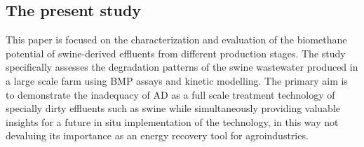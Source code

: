 \subsection{The present study}
This paper is focused on the characterization and evaluation of the biomethane potential of swine-derived effluents from different production stages. The study specifically assesses the degradation patterns of the swine wastewater produced in a large scale farm using BMP assays and kinetic modelling. The primary aim is to demonstrate the inadequacy of AD as a full scale treatment technology of specially dirty effluents such as swine  while simultaneously providing valuable insights for a future in situ implementation of the technology, in this way not devaluing its importance as an energy recovery tool for agroindustries.